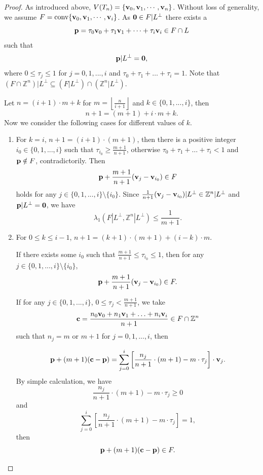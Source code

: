 \documentclass{amsart}
\newtheorem{lemma}[theorem]{Lemma}
\theoremstyle{definition}
\theoremstyle{remark}
\numberwithin{equation}{section}
\begin{document}
\begin{proof}
As introduced above, $V(T_n)=\{{\bf v}_0,{\bf v}_1,\cdots,{\bf v}_n\}$. Without loss of generality, we assume $F=\mathrm{conv}\{{\bf v}_0,{\bf v}_1,\cdots,{\bf v}_i\}$. As ${\bf 0}\in F|L^\perp$ there exists a $${\bf p}=\tau_0{\bf v}_0+\tau_1{\bf v}_1+\cdots+\tau_i{\bf v}_i\in F\cap L$$ such that $${\bf p}|L^\perp={\bf 0},$$ where $0\le\tau_j\le1$ for $j=0,1,...,i$ and $\tau_0+\tau_1+\ldots+\tau_i=1$. Note that $(F\cap\mathbb{Z}^n)|L^\perp\subseteq (F|L^\perp)\cap(\mathbb{Z}^n|L^\perp)$.


Let $n=(i+1)\cdot m+k$ for $m=\left\lfloor\frac{n}{i+1}\right\rfloor$ and $k\in\{0,1,...,i\}$, then $$n+1=(m+1)+i\cdot m+k.$$ Now we consider the following cases for different values of $k$.
\begin{enumerate}[fullwidth,itemindent=2em,label={\bf Case \arabic*.}] 
    \item For $k=i$, $n+1=(i+1)\cdot(m+1)$, then there is a positive integer $i_0\in\{0,1,...,i\}$ such that $\tau_{i_0}\ge\frac{m+1}{n+1}$, otherwise $\tau_0+\tau_1+\ldots+\tau_i<1$ and ${\bf p}\notin F$, contradictorily. Then 
$${\bf p}+\frac{m+1}{n+1}({\bf v}_j-{\bf v}_{i_0})\in F$$
holds for any $j\in\{0,1,...,i\}\setminus\{i_0\}$. Since $\frac{1}{n+1}({\bf v}_j-{\bf v}_{i_0})|L^\perp\in\mathbb{Z}^n|L^\perp$ and ${\bf p}|L^\perp={\bf 0}$, we have
$$\lambda_1(F|L^\perp,\mathbb{Z}^n|L^\perp)\le\frac{1}{m+1}.$$
  \item For $0\le k\le i-1$, $n+1=(k+1)\cdot(m+1)+(i-k)\cdot m$. 

 If there exists some $i_0$ such that $\frac{m+1}{n+1}\le\tau_{i_0}\le1$, then for any $j\in\{0,1,...,i\}\setminus\{i_0\}$,
  $${\bf p}+\frac{m+1}{n+1}({\bf v}_j-{\bf v}_{i_0})\in F.$$

  If for any $j\in\{0,1,...,i\}$, $0\le\tau_j<\frac{m+1}{n+1}$, we take 
  $${\bf c}=\frac{n_0{\bf v}_0+n_1{\bf v}_1+\ldots+n_i{\bf v}_i}{n+1}\in F\cap\mathbb{Z}^n$$ such that $n_j=m$ or $m+1$ for $j=0,1,...,i$, then 

\begin{align*}
 {\bf p}+(m+1)({\bf c}-{\bf p})=\underset{j=0}{\overset{i}{\sum}}\left[\frac{n_j}{n+1}\cdot(m+1)-m\cdot\tau_j\right]\cdot{\bf v}_j.
\end{align*}
By simple calculation, we have $$\frac{n_j}{n+1}\cdot(m+1)-m\cdot\tau_j\ge0$$
and
$$\underset{j=0}{\overset{i}{\sum}}\left[\frac{n_j}{n+1}\cdot(m+1)-m\cdot\tau_j\right]=1,$$ then
$$ {\bf p}+(m+1)({\bf c}-{\bf p})\in F.$$


\end{enumerate}
\end{proof}
\end{document}
